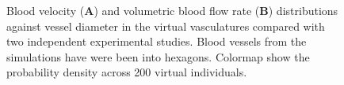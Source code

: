 \documentclass[11pt,]{article}
\begin{document}
\begin{figure}[ht!]
  \centering
  \begin{subfigure}[t]{.02\textwidth}
  \end{subfigure}
  \begin{subfigure}[t]{.45\textwidth}
  \end{subfigure}
  \hfill
  \begin{subfigure}[t]{.02\textwidth}
  \end{subfigure}
  \begin{subfigure}[t]{.45\textwidth}
  \end{subfigure}
  \hfill

  \caption{\label{fig:Flow-Velocity-dist}Blood velocity (\textbf{A}) and volumetric blood flow rate (\textbf{B}) distributions against vessel diameter in the virtual vasculatures compared with two independent experimental studies\cite{DoblhoffDier2014,Riva1985}. Blood vessels from the simulations have were been into hexagons. Colormap show the probability density across 200 virtual individuals.}
\end{figure}
\end{document}

